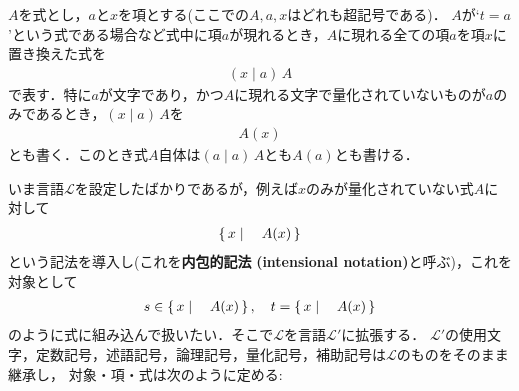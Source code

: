 	
	$A$を式とし，$a$と$x$を項とする(ここでの$A,a,x$はどれも超記号である)．
	$A$が`$t = a$'という式である場合など式中に項$a$が現れるとき，$A$に現れる全ての項$a$を項$x$に置き換えた式を
	\begin{align}
		(x \mid a)\, A
	\end{align}
	で表す．特に$a$が文字であり，かつ$A$に現れる文字で量化されていないものが$a$のみであるとき，$(x \mid a)\, A$を
	\begin{align}
		A(x)
	\end{align}
	とも書く．このとき式$A$自体は$(a \mid a)\, A$とも$A(a)$とも書ける．
	
	いま言語$\mathcal{L}$を設定したばかりであるが，例えば$x$のみが量化されていない式$A$に対して
	\begin{align}
		\left\{\, x \mid \quad A(x)\, \right\}
	\end{align}
	という記法を導入し(これを{\bf 内包的記法}
	{\bf (intensional notation)}と呼ぶ)，これを対象として
	\begin{align}
		s \in \left\{\, x \mid \quad A(x)\, \right\},\quad t = \left\{\, x \mid \quad A(x)\, \right\}
	\end{align}
	のように式に組み込んで扱いたい．そこで$\mathcal{L}$を言語$\mathcal{L}'$に拡張する．
	$\mathcal{L}'$の使用文字，定数記号，述語記号，論理記号，量化記号，補助記号は$\mathcal{L}$のものをそのまま継承し，
	対象・項・式は次のように定める:
	
